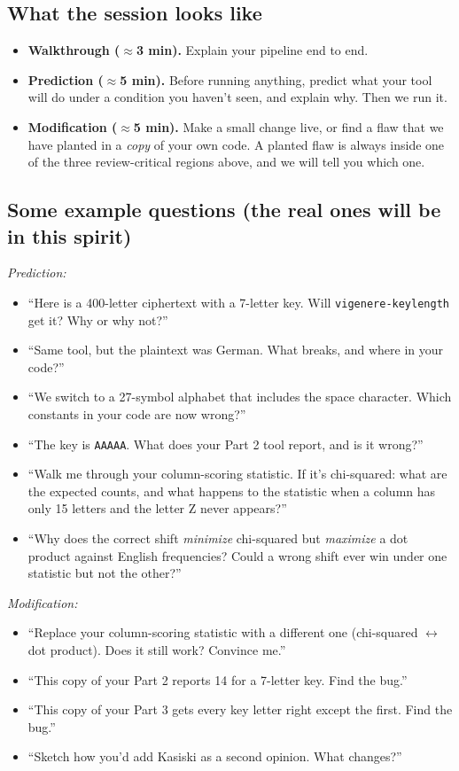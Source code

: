 \documentclass[11pt]{article}
\newcommand{\code}[1]{\texttt{#1}}
\begin{document}
\subsection*{What the session looks like}
\begin{itemize}
\item \textbf{Walkthrough ($\approx$3 min).} Explain your pipeline end to end.
\item \textbf{Prediction ($\approx$5 min).} Before running anything, predict what your tool will do under a condition you haven't seen, and explain why. Then we run it.
\item \textbf{Modification ($\approx$5 min).} Make a small change live, or find a flaw that we have planted in a \emph{copy} of your own code. A planted flaw is always inside one of the three review-critical regions above, and we will tell you which one.
\end{itemize}

\subsection*{Some example questions (the real ones will be in this spirit)}

\medskip \noindent
\emph{Prediction:}

\medskip \noindent
\begin{itemize}
\item ``Here is a 400-letter ciphertext with a 7-letter key. Will \code{vigenere-keylength} get it? Why or why not?''
\item ``Same tool, but the plaintext was German. What breaks, and where in your code?''
\item ``We switch to a 27-symbol alphabet that includes the space character. Which constants in your code are now wrong?''
\item ``The key is \code{AAAAA}. What does your Part 2 tool report, and is it wrong?''
\item ``Walk me through your column-scoring statistic. If it's chi-squared: what are the expected counts, and what happens to the statistic when a column has only 15 letters and the letter Z never appears?''
\item ``Why does the correct shift \emph{minimize} chi-squared but \emph{maximize} a dot product against English frequencies? Could a wrong shift ever win under one statistic but not the other?''
\end{itemize}

\medskip \noindent
\emph{Modification:}
\medskip \noindent
\begin{itemize}
\item ``Replace your column-scoring statistic with a different one (chi-squared $\leftrightarrow$ dot product). Does it still work? Convince me.''
\item ``This copy of your Part 2 reports 14 for a 7-letter key. Find the bug.''
\item ``This copy of your Part 3 gets every key letter right except the first. Find the bug.''
\item ``Sketch how you'd add Kasiski as a second opinion. What changes?''
\end{itemize}
\end{document}

